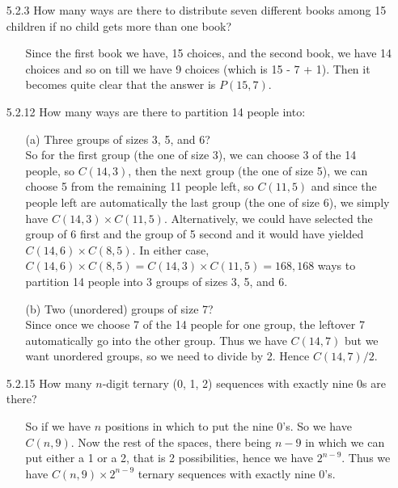 \documentclass[12pt]{article}
\begin{document}
\begin{enumerate}
\item[5.2.3] How many ways are there to distribute seven different books among 15 children if no child gets more than one book?
\begin{enumerate}
\item[] Since the first book we have, 15 choices, and the second book, we have 14 choices and so on till we have
9 choices (which is 15 - 7 + 1). Then it becomes quite clear that the answer is $P(15, 7)$.
\end{enumerate}

\item[5.2.12] How many ways are there to partition 14 people into:
\begin{enumerate}
\item[(a)] Three groups of sizes 3, 5, and 6? \\
So for the first group (the one of size 3), we can choose 3 of the 14 people, so $C(14, 3)$, then the next
group (the one of size 5), we can choose 5 from the remaining 11 people left, so $C(11 , 5)$ and since the people
left are automatically the last group (the one of size 6), we simply have $C(14, 3) \times C(11, 5)$. Alternatively,
we could have selected the group of 6 first and the group of 5 second and it would have yielded 
$C(14, 6) \times C(8, 5)$. In either case, $C(14, 6) \times C(8, 5) = C(14, 3) \times C(11, 5) = 168,168$ ways to 
partition 14 people into 3 groups of sizes 3, 5, and 6.
\item[(b)] Two (unordered) groups of size 7? \\ 
Since once we choose 7 of the 14 people for one group, the leftover 7 automatically go into the other
group. Thus we have $C(14, 7)$ but we want unordered groups, so we need to divide by 2. Hence $C(14, 7)/2$.
\end{enumerate}

\item[5.2.15] How many $n$-digit ternary (0, 1, 2) sequences with exactly nine 0s are there?
\begin{enumerate}
\item[] So if we have $n$ positions in which to put the nine 0's. So we have $C(n, 9)$. Now the rest of the spaces,
there being $n - 9$ in which we can put either a 1 or a 2, that is 2 possibilities, hence we have $2^{n-9}$. Thus
we have $C(n, 9) \times 2^{n-9}$ ternary sequences with exactly nine 0's.
\end{enumerate}


\end{enumerate}
\end{document}

